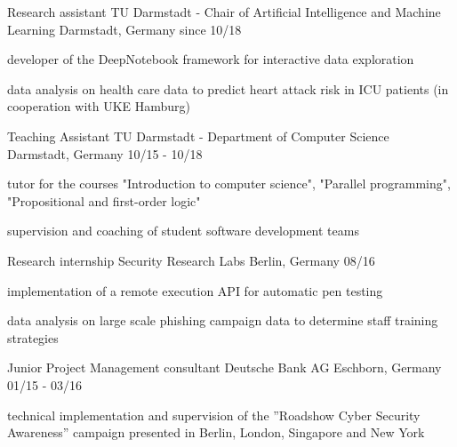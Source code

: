 

\begin{cventries}

  \cventry
    {Research assistant}
    {TU Darmstadt - Chair of Artificial Intelligence and Machine Learning}
    {Darmstadt, Germany}
    {since 10/18}
    {
        \begin{cvitems}
        \item {developer of the DeepNotebook framework for interactive data exploration}
        \item {data analysis on health care data to predict heart attack risk in ICU patients (in cooperation with UKE Hamburg)}
        \end{cvitems}
    }

  \cventry
    {Teaching Assistant} %
    {TU Darmstadt - Department of Computer Science} %
    {Darmstadt, Germany} %
    {10/15 - 10/18} %
    {
      \begin{cvitems} %
        \item {tutor for the courses "Introduction to computer science", "Parallel programming", "Propositional and first-order logic"}
        \item {supervision and coaching of student software development teams}
      \end{cvitems}
    }

  \cventry
    {Research internship} %
    {Security Research Labs} %
    {Berlin, Germany} %
    {08/16} %
    {
      \begin{cvitems} %
        \item {implementation of a remote execution API for automatic pen testing}
        \item {data analysis on large scale phishing campaign data to determine staff training strategies}
      \end{cvitems}
    }

  \cventry
    {Junior Project Management consultant} %
    {Deutsche Bank AG} %
    {Eschborn, Germany} %
    {01/15 - 03/16} %
    {
      \begin{cvitems} %
        \item {technical implementation and supervision of the ”Roadshow Cyber Security
Awareness” campaign presented in Berlin, London, Singapore and New York}
      \end{cvitems}
    }

\end{cventries}
